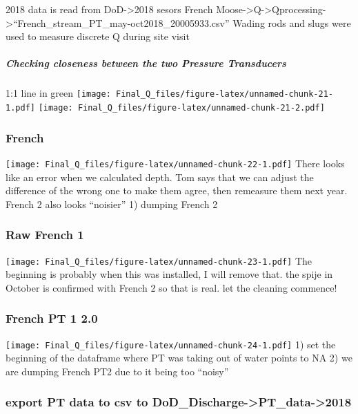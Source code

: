 \documentclass[
]{article}
\begin{document}
2018 data is read from DoD-\textgreater2018 sesors French
Moose-\textgreater Q-\textgreater Qprocessing-\textgreater{}``French\_stream\_PT\_may-oct2018\_20005933.csv''
Wading rods and slugs were used to measure discrete Q during site visit

\hypertarget{checking-closeness-between-the-two-pressure-transducers}{%
\subparagraph{Checking closeness between the two Pressure
Transducers}\label{checking-closeness-between-the-two-pressure-transducers}}

1:1 line in green
\texttt{[image: Final\_Q\_files/figure-latex/unnamed-chunk-21-1.pdf]}
\texttt{[image: Final\_Q\_files/figure-latex/unnamed-chunk-21-2.pdf]}

\hypertarget{french}{%
\subsubsection{French}\label{french}}

\texttt{[image: Final\_Q\_files/figure-latex/unnamed-chunk-22-1.pdf]}
There looks like an error when we calculated depth. Tom says that we can
adjust the difference of the wrong one to make them agree, then
remeasure them next year. French 2 also looks ``noisier'' 1) dumping
French 2

\hypertarget{raw-french-1}{%
\subsubsection{Raw French 1}\label{raw-french-1}}

\texttt{[image: Final\_Q\_files/figure-latex/unnamed-chunk-23-1.pdf]} The
beginning is probably when this was installed, I will remove that. the
spije in October is confirmed with French 2 so that is real. let the
cleaning commence!

\hypertarget{french-pt-1-2.0}{%
\subsubsection{French PT 1 2.0}\label{french-pt-1-2.0}}

\texttt{[image: Final\_Q\_files/figure-latex/unnamed-chunk-24-1.pdf]} 1)
set the beginning of the dataframe where PT was taking out of water
points to NA 2) we are dumping French PT2 due to it being too ``noisy''

\hypertarget{export-pt-data-to-csv-to-dod_discharge-pt_data-2018}{%
\subsubsection{export PT data to csv to
DoD\_Discharge-\textgreater PT\_data-\textgreater2018}\label{export-pt-data-to-csv-to-dod_discharge-pt_data-2018}}
\end{document}
